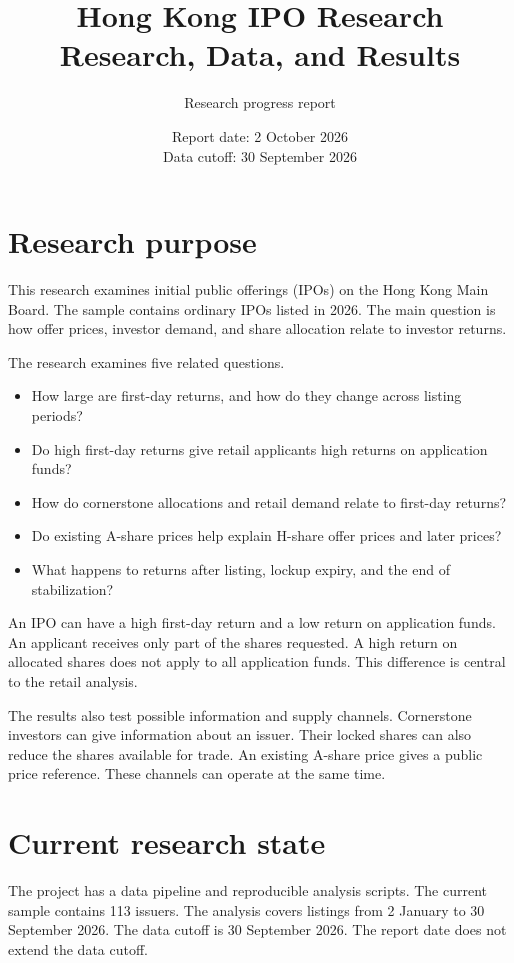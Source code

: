 \documentclass[11pt,a4paper]{article}
\title{Hong Kong IPO Research\\Research, Data, and Results}
\author{Research progress report}
\date{Report date: 2 October 2026\\Data cutoff: 30 September 2026}
\begin{document}
\maketitle

\section{Research purpose}
This research examines initial public offerings (IPOs) on the Hong Kong Main Board.
The sample contains ordinary IPOs listed in 2026.
The main question is how offer prices, investor demand, and share allocation relate to investor returns.

The research examines five related questions.
\begin{itemize}
\item How large are first-day returns, and how do they change across listing periods?
\item Do high first-day returns give retail applicants high returns on application funds?
\item How do cornerstone allocations and retail demand relate to first-day returns?
\item Do existing A-share prices help explain H-share offer prices and later prices?
\item What happens to returns after listing, lockup expiry, and the end of stabilization?
\end{itemize}

An IPO can have a high first-day return and a low return on application funds.
An applicant receives only part of the shares requested.
A high return on allocated shares does not apply to all application funds.
This difference is central to the retail analysis.

The results also test possible information and supply channels.
Cornerstone investors can give information about an issuer.
Their locked shares can also reduce the shares available for trade.
An existing A-share price gives a public price reference.
These channels can operate at the same time.

\section{Current research state}
The project has a data pipeline and reproducible analysis scripts.
The current sample contains 113 issuers.
The analysis covers listings from 2 January to 30 September 2026.
The data cutoff is 30 September 2026.
The report date does not extend the data cutoff.
\end{document}
